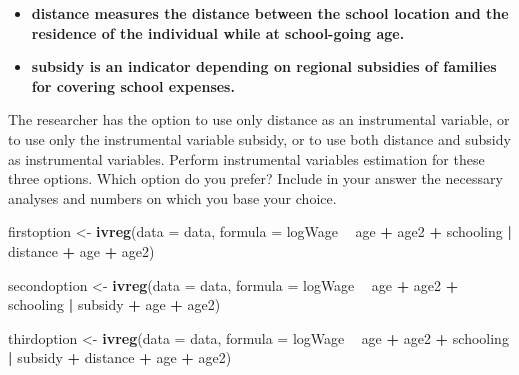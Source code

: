 \documentclass[
]{article}
\newenvironment{Shaded}{\begin{snugshade}}{\end{snugshade}}
\newcommand{\DataTypeTok}[1]{\textcolor[rgb]{0.13,0.29,0.53}{#1}}
\newcommand{\KeywordTok}[1]{\textcolor[rgb]{0.13,0.29,0.53}{\textbf{#1}}}
\newcommand{\NormalTok}[1]{#1}
\newcommand{\OperatorTok}[1]{\textcolor[rgb]{0.81,0.36,0.00}{\textbf{#1}}}
\newcommand{\StringTok}[1]{\textcolor[rgb]{0.31,0.60,0.02}{#1}}
\providecommand{\tightlist}{%
  \setlength{\itemsep}{0pt}\setlength{\parskip}{0pt}}
\begin{document}
\begin{itemize}
\tightlist
\item
  \textbf{distance measures the distance between the school location and
  the residence of the individual while at school-going age.}
\item
  \textbf{subsidy is an indicator depending on regional subsidies of
  families for covering school expenses.}
\end{itemize}

The researcher has the option to use only distance as an instrumental
variable, or to use only the instrumental variable subsidy, or to use
both distance and subsidy as instrumental variables. Perform
instrumental variables estimation for these three options. Which option
do you prefer? Include in your answer the necessary analyses and numbers
on which you base your choice.

\begin{Shaded}
\begin{Highlighting}[]
\NormalTok{firstoption <-}\StringTok{ }\KeywordTok{ivreg}\NormalTok{(}\DataTypeTok{data =}\NormalTok{ data, }\DataTypeTok{formula =} 
\NormalTok{                         logWage }\OperatorTok{~}\StringTok{ }\NormalTok{age }\OperatorTok{+}\StringTok{ }\NormalTok{age2 }\OperatorTok{+}\StringTok{ }\NormalTok{schooling }\OperatorTok{|}\StringTok{ }\NormalTok{distance }\OperatorTok{+}\StringTok{ }\NormalTok{age }\OperatorTok{+}\StringTok{ }\NormalTok{age2)}

\NormalTok{secondoption <-}\StringTok{ }\KeywordTok{ivreg}\NormalTok{(}\DataTypeTok{data =}\NormalTok{ data, }\DataTypeTok{formula =}
\NormalTok{                          logWage }\OperatorTok{~}\StringTok{ }\NormalTok{age }\OperatorTok{+}\StringTok{ }\NormalTok{age2 }\OperatorTok{+}\StringTok{ }\NormalTok{schooling }\OperatorTok{|}\StringTok{ }\NormalTok{subsidy }\OperatorTok{+}\StringTok{ }\NormalTok{age }\OperatorTok{+}\StringTok{ }\NormalTok{age2)}

\NormalTok{thirdoption <-}\StringTok{ }\KeywordTok{ivreg}\NormalTok{(}\DataTypeTok{data =}\NormalTok{ data, }\DataTypeTok{formula =}
\NormalTok{                          logWage }\OperatorTok{~}\StringTok{ }\NormalTok{age }\OperatorTok{+}\StringTok{ }\NormalTok{age2 }\OperatorTok{+}\StringTok{ }\NormalTok{schooling }\OperatorTok{|}\StringTok{ }\NormalTok{subsidy }\OperatorTok{+}\StringTok{ }\NormalTok{distance }\OperatorTok{+}\StringTok{ }\NormalTok{age }
                     \OperatorTok{+}\StringTok{ }\NormalTok{age2)}
\end{Highlighting}
\end{Shaded}
\end{document}
